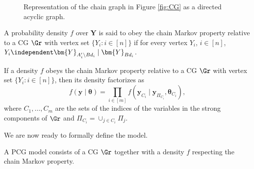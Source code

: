 \begin{figure}
\begin{center}
\end{center}
\caption{Representation of the chain graph in Figure \ref{fig:CG} as a directed acyclic graph. \label{fig:CGDAG}}
\end{figure}

\begin{definition}
A probability density $f$ over $\bm{Y}$ is said to obey the chain Markov property relative to a \gls{CG} $\Gr$ with vertex set $\{Y_i:i\in [n]\}$ if for every vertex $Y_i$, $i\in[n]$,
$
Y_i\independent \bm{Y}_{A_i'\setminus Bd_i}\;|\; \bm{Y}_{Bd_i}$.
\end{definition}


\begin{proposition}
If a density $f$ obeys the chain Markov property relative to a \gls{CG} $\Gr$ with vertex set $\{Y_i:i\in[n]\}$, then its density factorizes as
\begin{equation*}
\label{eq:chainfactorization}
f(\bm{y}\;|\; \bm{\theta})= \prod_{i\in[m]} f\left(\bm{y}_{C_i}\;|\; \bm{y}_{\Pi_{C_i}}, \bm{\theta}_{C_i}\right),
\end{equation*}
where $C_1,\dots,C_m$ are the sets of the indices of the variables in the strong components of $\Gr$ and $\Pi_{C_i}=\cup_{j\in C_i}\Pi_j$. 
\end{proposition}


We are now ready to formally define the model.
\begin{definition}
A \gls{PCG} model consists of a \gls{CG} $\Gr$ together with a density $f$ respecting the chain Markov property. 
\end{definition} 

